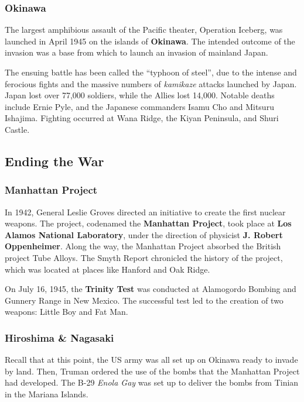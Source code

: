 \subsubsection*{Okinawa}

The largest amphibious assault of the Pacific theater, Operation Iceberg,
was launched in April 1945 on the islands of \textbf{Okinawa}.
The intended outcome of the invasion was a base from which to launch an invasion of mainland Japan.

The ensuing battle has been called the ``typhoon of steel'',
due to the intense and ferocious fights and the massive numbers of \textit{kamikaze} attacks launched by Japan.
Japan lost over 77,000 soldiers, while the Allies lost 14,000.
Notable deaths include Ernie Pyle, and the Japanese commanders Isamu Cho and Mitsuru Ishajima.
Fighting occurred at Wana Ridge, the Kiyan Peninsula, and Shuri Castle.

\subsection*{Ending the War}

\subsubsection*{Manhattan Project}

In 1942, General Leslie Groves directed an initiative to create the first nuclear weapons.
The project, codenamed the \textbf{Manhattan Project}, took place at \textbf{Los Alamos National Laboratory},
under the direction of physicist \textbf{J. Robert Oppenheimer}.
Along the way, the Manhattan Project absorbed the British project Tube Alloys.
The Smyth Report chronicled the history of the project, which was located at places like Hanford and Oak Ridge.

On July 16, 1945, the \textbf{Trinity Test} was conducted at Alamogordo Bombing and Gunnery Range in New Mexico.
The successful test led to the creation of two weapons: Little Boy and Fat Man.

\subsubsection*{Hiroshima \& Nagasaki}

Recall that at this point, the US army was all set up on Okinawa ready to invade by land.
Then, Truman ordered the use of the bombs that the Manhattan Project had developed.
The B-29 \textit{Enola Gay} was set up to deliver the bombs from Tinian in the Mariana Islands.

